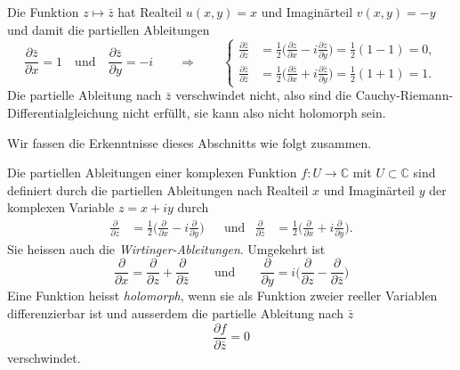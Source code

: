 \begin{beispiel}
Die Funktion $z\mapsto\bar{z}$ hat Realteil $u(x,y)=x$ und
Imaginärteil $v(x,y)=-y$ und damit die partiellen Ableitungen
\[
\frac{\partial \bar{z}}{\partial x} = 1 
\quad\text{und}\quad
\frac{\partial \bar{z}}{\partial y} = -i
\qquad\Rightarrow\qquad
\left\{
\begin{aligned}
\frac{\partial \bar{z}}{\partial z}
&=
\frac12
\biggl(
\frac{\partial z}{\partial x}
-i
\frac{\partial z}{\partial y}
\biggr)
=
\frac12 (1-1)
=
0,
\\
\frac{\partial \bar{z}}{\partial \bar{z}}
&=
\frac12
\biggl(
\frac{\partial\bar{z}}{\partial x}
+i
\frac{\partial\bar{z}}{\partial y}
\biggr)
=
\frac12(1+1)
=
1.
\end{aligned}
\right.
\]
Die partielle Ableitung nach $\bar{z}$ verschwindet nicht, also
sind die Cauchy-Riemann-Diffe\-rentialgleichung nicht erfüllt, sie
kann also nicht holomorph sein.
\end{beispiel}

Wir fassen die Erkenntnisse dieses Abschnitts wie folgt zusammen.

\begin{definition}
Die partiellen Ableitungen einer komplexen Funktion $f\colon U\to\mathbb{C}$
mit $U\subset\mathbb{C}$ sind definiert durch die partiellen Ableitungen
nach Realteil $x$ und Imaginärteil $y$ der komplexen Variable $z=x+iy$
durch
\begin{align*}
\frac{\partial}{\partial z}
&=
\frac12\biggl(
\frac{\partial}{\partial x}
-i
\frac{\partial}{\partial y}
\biggr)
&&\text{und}&
\frac{\partial}{\partial\bar{z}}
&=
\frac12\biggl(
\frac{\partial}{\partial x}
+i
\frac{\partial}{\partial y}
\biggr).
\end{align*}
Sie heissen auch die \emph{Wirtinger-Ableitungen}.
%
Umgekehrt ist
\[
\frac{\partial}{\partial x}
=
\frac{\partial}{\partial z}
+
\frac{\partial}{\partial\bar{z}}
\qquad\text{und}\qquad
\frac{\partial}{\partial y}
=
i
\biggl(
\frac{\partial}{\partial z}
-
\frac{\partial}{\partial\bar{z}}
\biggr)
\]
Eine Funktion heisst \emph{holomorph}, wenn sie als Funktion zweier
reeller Variablen differenzierbar ist und ausserdem die partielle
Ableitung nach $\bar{z}$
\[
\frac{\partial f}{\partial \bar{z}}
=
0
\]
verschwindet.
\end{definition}

